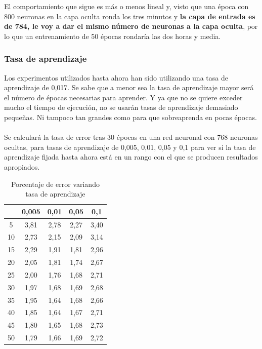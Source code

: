 El comportamiento que sigue es más o menos lineal y, visto que una época con 800 neuronas en la capa oculta ronda los tres minutos y\textbf{ la capa de entrada es de 784, le voy a dar el mismo número de neuronas a la capa oculta}, por lo que un entrenamiento de 50 épocas rondaría las dos horas y media.

\subsubsection{Tasa de aprendizaje}

Los experimentos utilizados hasta ahora han sido utilizando una tasa de aprendizaje de 0,017. Se sabe que a menor sea la tasa de aprendizaje mayor será el número de épocas necesarias para aprender. Y ya que no se quiere exceder mucho el tiempo de ejecución, no se usarán tasas de aprendizaje demasiado pequeñas. Ni tampoco tan grandes como para que sobreaprenda en pocas épocas.
\\ \\
Se calculará la tasa de error tras 30 épocas en una red neuronal con 768 neuronas ocultas, para tasas de aprendizaje de 0,005, 0,01, 0,05 y 0,1 para ver si la tasa de aprendizaje fijada hasta ahora está en un rango con el que se producen resultados apropiados.
\begin{table}[H]
	\centering
	\caption{Porcentaje de error variando tasa de aprendizaje}
	\label{tab:learning-rate}
	\begin{tabular}{| c | c | c | c | c |}
		\hline
		  & 0,005 & 0,01 & 0,05 & 0,1  \\ 
		\hline
		5  & 3,81 & 2,78 & 2,27 & 3,40 \\
		10 & 2,73 & 2,15 & 2,09 & 3,14 \\
		15 & 2,29 & 1,91 & 1,81 & 2,96 \\
		20 & 2,05 & 1,81 & 1,74 & 2,67 \\
		25 & 2,00 & 1,76 & 1,68 & 2,71 \\
		30 & 1,97 & 1,68 & 1,69 & 2,68 \\
		35 & 1,95 & 1,64 & 1,68 & 2,66 \\
		40 & 1,85 & 1,64 & 1,67 & 2,71 \\
		45 & 1,80 & 1,65 & 1,68 & 2,73 \\
		50 & 1,79 & 1,66 & 1,69 & 2,72 \\ 
		\hline
	\end{tabular}
\end{table}

